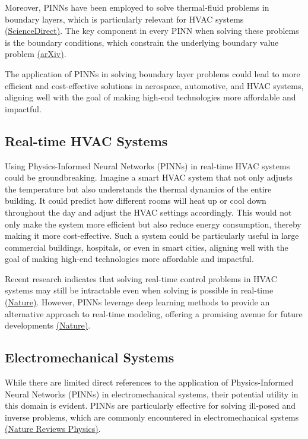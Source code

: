 \documentclass[12pt]{article}
\begin{document}
	Moreover, PINNs have been employed to solve thermal-fluid problems in boundary layers, which is particularly relevant for HVAC systems \href{https://www.sciencedirect.com/science/article/pii/S0735193322000124}{(ScienceDirect)}. The key component in every PINN when solving these problems is the boundary conditions, which constrain the underlying boundary value problem \href{https://arxiv.org/abs/2310.02548}{(arXiv)}.
	
	The application of PINNs in solving boundary layer problems could lead to more efficient and cost-effective solutions in aerospace, automotive, and HVAC systems, aligning well with the goal of making high-end technologies more affordable and impactful.
	
	
	\subsection{Real-time HVAC Systems}
	Using Physics-Informed Neural Networks (PINNs) in real-time HVAC systems could be groundbreaking. Imagine a smart HVAC system that not only adjusts the temperature but also understands the thermal dynamics of the entire building. It could predict how different rooms will heat up or cool down throughout the day and adjust the HVAC settings accordingly. This would not only make the system more efficient but also reduce energy consumption, thereby making it more cost-effective. Such a system could be particularly useful in large commercial buildings, hospitals, or even in smart cities, aligning well with the goal of making high-end technologies more affordable and impactful.
	
	Recent research indicates that solving real-time control problems in HVAC systems may still be intractable even when solving is possible in real-time \href{https://www.nature.com/articles/s41598-023-36799-6}{(Nature)}. However, PINNs leverage deep learning methods to provide an alternative approach to real-time modeling, offering a promising avenue for future developments \href{https://www.nature.com/articles/s41598-023-43325-1}{(Nature)}.
	
	
	\subsection{Electromechanical Systems}
	While there are limited direct references to the application of Physics-Informed Neural Networks (PINNs) in electromechanical systems, their potential utility in this domain is evident. PINNs are particularly effective for solving ill-posed and inverse problems, which are commonly encountered in electromechanical systems \href{https://www.nature.com/articles/s42254-021-00314-5}{(Nature Reviews Physics)}. 
	
\end{document}
